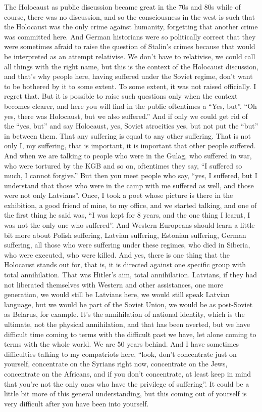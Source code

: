 The Holocaust as public discussion became great in the 70s and 80s while of course, there was no discussion, and so the consciousness in the west is such that the Holocaust was the only crime against humanity, forgetting that another crime was committed here. And German historians were so politically correct that they were sometimes afraid to raise the question of Stalin's crimes because that would be interpreted as an attempt relativise. We don’t have to relativise, we could call all things with the right name, but this is the context of the Holocaust discussion, and that's why people here, having suffered under the Soviet regime, don't want to be bothered by it to some extent. To some extent, it was not raised officially. I regret that. But it is possible to raise such questions only when the context becomes clearer, and here you will find in the public oftentimes a ``Yes, but''. ``Oh yes, there was Holocaust, but we also suffered.'' And if only we could get rid of the ``yes, but'' and say Holocaust, yes, Soviet atrocities yes, but not put the ``but'' in between them. That any suffering is equal to any other suffering. That is not only I, my suffering, that is important, it is important that other people suffered. And when we are talking to people who were in the Gulag, who suffered in war, who were tortured by the KGB and so on, oftentimes they say, ``I suffered so much, I cannot forgive.'' But then you meet people who say, ``yes, I suffered, but I understand that those who were in the camp with me suffered as well, and those were not only Latvians''. Once, I took a poet whose picture is there in the exhibition, a good friend of mine, to my office, and we started talking, and one of the first thing he said was, ``I was kept for 8 years, and the one thing I learnt, I was not the only one who suffered''. And Western Europeans should learn a little bit more about Polish suffering, Latvian suffering, Estonian suffering, German suffering, all those who were suffering under these regimes, who died in Siberia, who were executed, who were killed. And yes, there is one thing that the Holocaust stands out for, that is, it is directed against one specific group with total annihilation. That was Hitler's aim, total annihilation. Latvians, if they had not liberated themselves with Western and other assistances, one more generation, we would still be Latvians here, we would still speak Latvian language, but we would be part of the Soviet Union, we would be as post-Soviet as Belarus, for example. It's the annihilation of national identity, which is the ultimate, not the physical annihilation, and that has been averted, but we have difficult time coming to terms with the difficult past we have, let alone coming to terms with the whole world. We are 50 years behind. And I have sometimes difficulties talking to my compatriots here, ``look, don't concentrate just on yourself, concentrate on the Syrians right now, concentrate on the Jews, concentrate on the Africans, and if you don’t concentrate, at least keep in mind that you're not the only ones who have the privilege of suffering''. It could be a little bit more of this general understanding, but this coming out of yourself is very difficult after you have been into yourself. 

